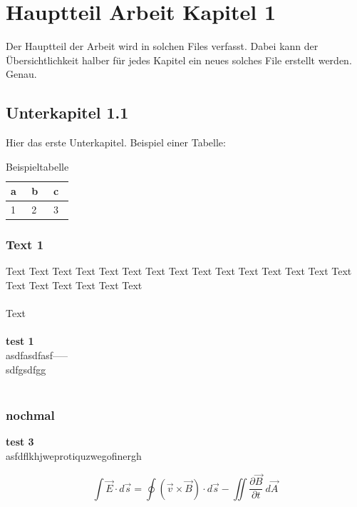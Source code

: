 \section{Hauptteil Arbeit Kapitel 1}
\label{s:Hauptteil Arbeit Kapitel 1}

Der Hauptteil der Arbeit wird in solchen Files verfasst. Dabei kann der Übersichtlichkeit halber für jedes Kapitel ein neues solches
File erstellt werden.\\
Genau.

\subsection{Unterkapitel 1.1}
Hier das erste Unterkapitel. Beispiel einer Tabelle:
\begin{table}[!htb]
	\centering
		\begin{tabular}{|l|l|l|}
		\hline
	  a & b & c \\
		\hline
		1 & 2 & 3 \\
	  \hline
		\end{tabular}
	\caption{Beispieltabelle}
	\label{tab:beispieltabelle}
\end{table}

\subsubsection{Text 1}


Text Text Text Text Text Text Text Text Text Text Text Text Text Text Text Text Text Text Text Text Text \\\\
Text \\\\
\textbf{test 1}\\ 
asdfasdfasf-----\\
sdfgsdfgg\\\\
\subsubsection{nochmal}


\textbf{test 3}\\

asfdflkhjweprotiquzwegofinergh

\begin{equation}
	\label{eqn:blabla}
	\int \vec{E} \cdot d\vec{s} = \oint (\vec{v} \times \vec{B}) \cdot d\vec{s} - \iint \frac{\partial \vec{B}}{\partial t} \ d\vec{A}
\end{equation}

